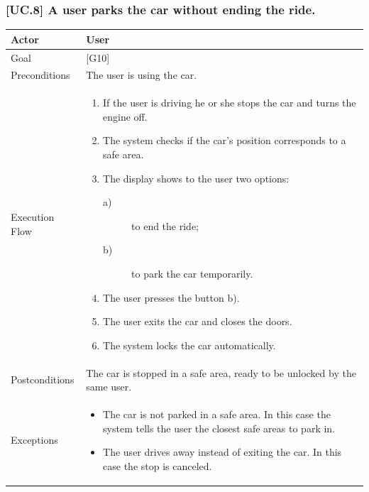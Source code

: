 \documentclass[english]{article}
\begin{document}
\subsubsection{[UC.8] A user parks the car without ending the ride.}
		\begin{tabularx}{\textwidth}{  l  X  }
			\hline
			Actor & User\\
			\hline
			Goal & [G10]\\
			\hline
			Preconditions & The user is using the car.\\
			\hline
			Execution Flow & \begin{enumerate}
				\item{If the user is driving he or she stops the car and turns the engine off.}
				\item{The system checks if the car's position corresponds to a safe area.}
				\item{The display shows to the user two options:
					\begin{description}
						\item[a)]{ to end the ride;}
						\item[b)]{ to park the car temporarily.}
					\end{description}}
					\item{The user presses the button b).}
					\item{The user exits the car and closes the doors.}
					\item{The system locks the car automatically.}
				\end{enumerate}\\
				\hline
				Postconditions & The car is stopped in a safe area, ready to be unlocked by the same user.\\
				\hline
				Exceptions & \begin{itemize}
					\item{The car is not parked in a safe area. In this case the system tells the user the closest safe areas to park in.}
					\item{The user drives away instead of exiting the car. In this case the stop is canceled.}
				\end{itemize}\\
				\hline
		\end{tabularx}
\end{document}
